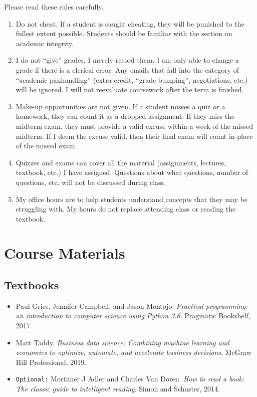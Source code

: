 \documentclass[11pt]{paper}
\begin{document}
Please read these rules carefully.

\begin{enumerate}

\item Do not cheat. If a student is caught cheating, they will be punished to the fullest extent possible. Students should be familiar with the section on academic integrity.

\item I do not ``give'' grades, I merely record them. I am only able to change a grade if there is a clerical error. Any emails that fall into the category of ``academic panhandling'' (extra credit, ``grade bumping'', negotiations, etc.) will be ignored. I will not reevaluate coursework after the term is finished.

\item Make-up opportunities are not given. If a student misses a quiz or a homework, they can count it as a dropped assignment. If they miss the midterm exam, they must provide a valid excuse within a week of the missed midterm. If I deem the excuse valid, then their final exam will count in-place of the missed exam. 

\item Quizzes and exams can cover all the material (assignments, lectures, textbook, etc.) I have assigned. Questions about what questions, number of questions, etc. will not be discussed during class.

\item My office hours are to help students understand concepts that they may be struggling with. My hours do not replace attending class or reading the textbook.



\end{enumerate}


\section{Course Materials}
 
\subsection{Textbooks}

\begin{itemize}
\item Paul Gries, Jennifer Campbell, and Jason Montojo. \textit{Practical programming: an introduction to computer science using Python 3.6}. Pragmatic Bookshelf, 2017.

\item Matt Taddy. \textit{Business data science: Combining machine learning and economics to optimize, automate, and accelerate business decisions}. McGraw Hill Professional, 2019.

\item \texttt{Optional:}  Mortimer J Adler and Charles Van Doren. \textit{How to read a book: The classic guide to intelligent reading}. Simon and Schuster, 2014.

\end{itemize}
\end{document}
